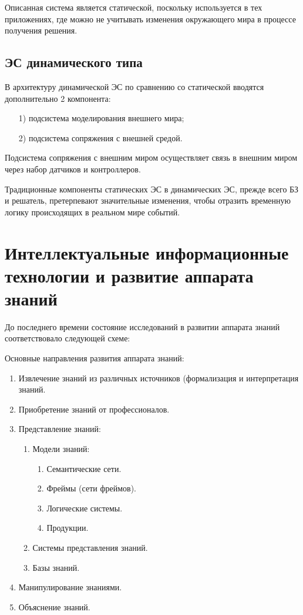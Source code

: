 Описанная система является статической, поскольку используется в тех
приложениях, где можно не учитывать изменения окружающего мира в
процессе получения решения.

\subsection{ЭС динамического типа}

В архитектуру динамической ЭС по сравнению со статической вводятся
дополнительно 2 компонента:
\begin{enumerate}
\item[1)] подсистема моделирования внешнего мира;
\item[2)] подсистема сопряжения с внешней средой.
\end{enumerate}

Подсистема сопряжения с внешним миром осуществляет связь в внешним
миром через набор датчиков и контроллеров.

Традиционные компоненты статических ЭС в динамических ЭС, прежде
всего БЗ и решатель, претерпевают значительные изменения, чтобы
отразить временную логику происходящих в реальном мире событий.


\section{Интеллектуальные информационные технологии и развитие
  аппарата знаний}

До последнего времени состояние исследований в развитии аппарата
знаний соответствовало следующей схеме:

Основные направления развития аппарата знаний:
\begin{enumerate}
\item Извлечение знаний из различных источников (формализация и
  интерпретация знаний.
\item Приобретение знаний от профессионалов.
\item Представление знаний:
  \begin{enumerate}
  \item Модели знаний:
    \begin{enumerate}
    \item Семантические сети.
    \item Фреймы (сети фреймов).
    \item Логические системы.
    \item Продукции.
    \end{enumerate}
  \item Системы представления знаний.
  \item Базы знаний.
  \end{enumerate}
\item Манипулирование знаниями.
\item Объяснение знаний.
\end{enumerate}

